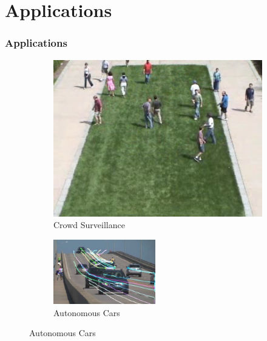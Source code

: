 \documentclass{beamer}
\begin{document}
\section{Applications}
\begin{frame}
\frametitle{Applications}


         \begin{figure}[h]
         	\begin{subfigure}[t]{.3\textwidth}
         		\includegraphics[width=1\linewidth]{images/umn_normal1.png}
         		\caption{Crowd Surveillance \cite{umn_crowd}}
         	\end{subfigure}\hfill%
         	\begin{subfigure}[t]{.3\textwidth}
         		
         		\includegraphics[height = 2.81cm,width=1\linewidth]{images/lk_flow.jpg}
         		\caption{Autonomous Cars \cite{opt_flow_opencv}}
         		

\end{subfigure}
\end{figure}
\end{frame}
\end{document}
